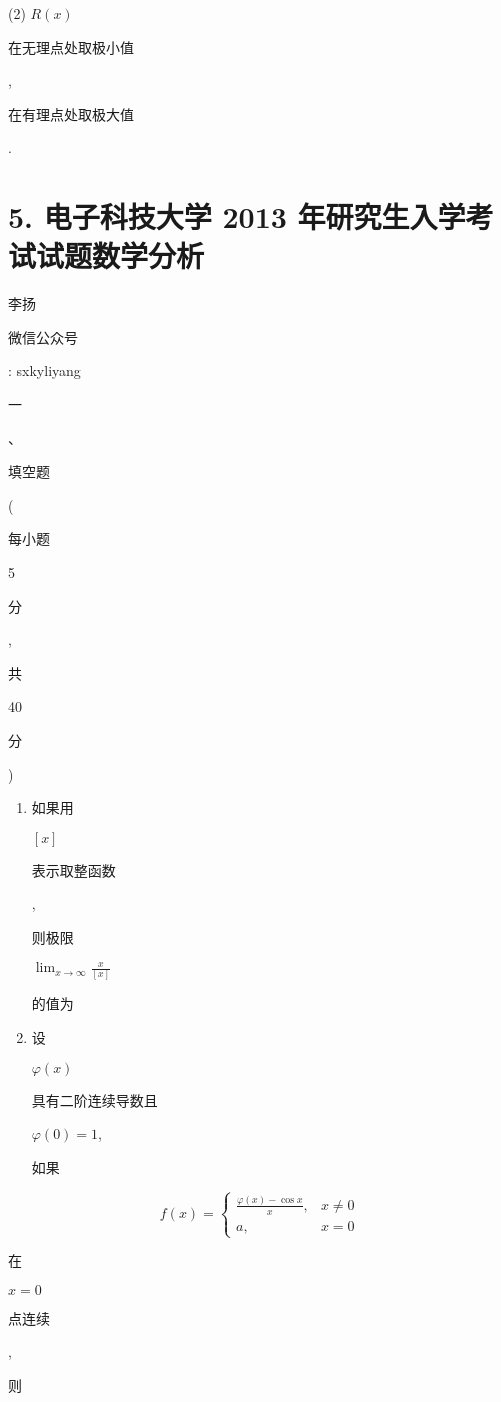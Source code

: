 \documentclass[10pt]{article}
\begin{document}
(2) $R(x)$ \begin{CJK}{UTF8}{mj}在无理点处取极小值\end{CJK}, \begin{CJK}{UTF8}{mj}在有理点处取极大值\end{CJK}.

\section{5. 电子科技大学 2013 年研究生入学考试试题数学分析}
\begin{CJK}{UTF8}{mj}李扬\end{CJK}

\begin{CJK}{UTF8}{mj}微信公众号\end{CJK}: sxkyliyang

\begin{CJK}{UTF8}{mj}一\end{CJK}、\begin{CJK}{UTF8}{mj}填空题\end{CJK}(\begin{CJK}{UTF8}{mj}每小题\end{CJK} 5 \begin{CJK}{UTF8}{mj}分\end{CJK}, \begin{CJK}{UTF8}{mj}共\end{CJK} 40 \begin{CJK}{UTF8}{mj}分\end{CJK})

\begin{enumerate}
  \item \begin{CJK}{UTF8}{mj}如果用\end{CJK} $[x]$ \begin{CJK}{UTF8}{mj}表示取整函数\end{CJK}, \begin{CJK}{UTF8}{mj}则极限\end{CJK} $\lim _{x \rightarrow \infty} \frac{x}{[x]}$ \begin{CJK}{UTF8}{mj}的值为\end{CJK}

  \item \begin{CJK}{UTF8}{mj}设\end{CJK} $\varphi(x)$ \begin{CJK}{UTF8}{mj}具有二阶连续导数且\end{CJK} $\varphi(0)=1$, \begin{CJK}{UTF8}{mj}如果\end{CJK}

\end{enumerate}
$$
f(x)= \begin{cases}\frac{\varphi(x)-\cos x}{x}, & x \neq 0 \\ a, & x=0\end{cases}
$$
\begin{CJK}{UTF8}{mj}在\end{CJK} $x=0$ \begin{CJK}{UTF8}{mj}点连续\end{CJK}, \begin{CJK}{UTF8}{mj}则\end{CJK}
\end{document}
